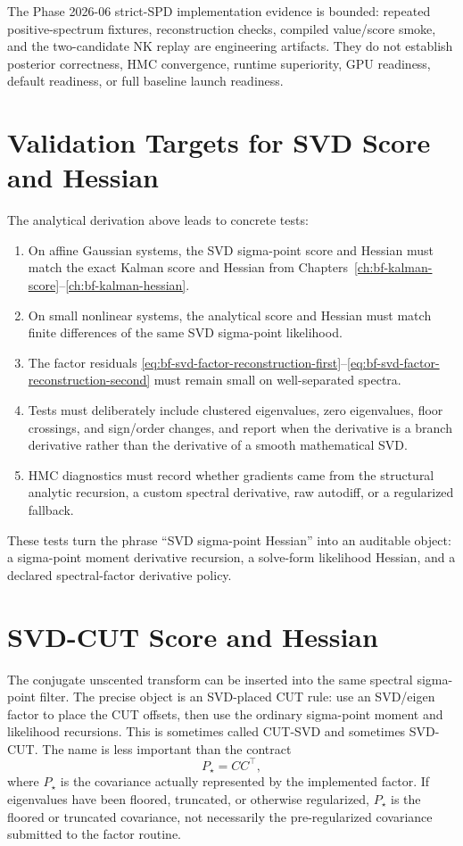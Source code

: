 The Phase 2026-06 strict-SPD implementation evidence is bounded: repeated
positive-spectrum fixtures, reconstruction checks, compiled value/score smoke,
and the two-candidate NK replay are engineering artifacts.  They do not
establish posterior correctness, HMC convergence, runtime superiority,
GPU readiness, default readiness, or full baseline launch readiness.

\section{Validation Targets for SVD Score and Hessian}
\label{sec:bf-svd-sp-derivative-validation}

The analytical derivation above leads to concrete tests:
\begin{enumerate}[label=(\roman*)]
  \item On affine Gaussian systems, the SVD sigma-point score and Hessian must
    match the exact Kalman score and Hessian from
    Chapters~\ref{ch:bf-kalman-score}--\ref{ch:bf-kalman-hessian}.
  \item On small nonlinear systems, the analytical score and Hessian must match
    finite differences of the same SVD sigma-point likelihood.
  \item The factor residuals
    \eqref{eq:bf-svd-factor-reconstruction-first}--\eqref{eq:bf-svd-factor-reconstruction-second}
    must remain small on well-separated spectra.
  \item Tests must deliberately include clustered eigenvalues, zero eigenvalues,
    floor crossings, and sign/order changes, and report when the derivative is a
    branch derivative rather than the derivative of a smooth mathematical SVD.
  \item HMC diagnostics must record whether gradients came from the structural
    analytic recursion, a custom spectral derivative, raw autodiff, or a
    regularized fallback.
\end{enumerate}
These tests turn the phrase ``SVD sigma-point Hessian'' into an auditable object:
a sigma-point moment derivative recursion, a solve-form likelihood Hessian, and
a declared spectral-factor derivative policy.

\section{SVD-CUT Score and Hessian}
\label{sec:bf-cut-svd-score-hessian}

The conjugate unscented transform can be inserted into the same spectral
sigma-point filter.  The precise object is an SVD-placed CUT rule: use an
SVD/eigen factor to place the CUT offsets, then use the ordinary sigma-point
moment and likelihood recursions.  This is sometimes called CUT-SVD and
sometimes SVD-CUT.  The name is less important than the contract
\[
  P_\star=C C^\top ,
\]
where $P_\star$ is the covariance actually represented by the implemented
factor.  If eigenvalues have been floored, truncated, or otherwise regularized,
$P_\star$ is the floored or truncated covariance, not necessarily the
pre-regularized covariance submitted to the factor routine.

